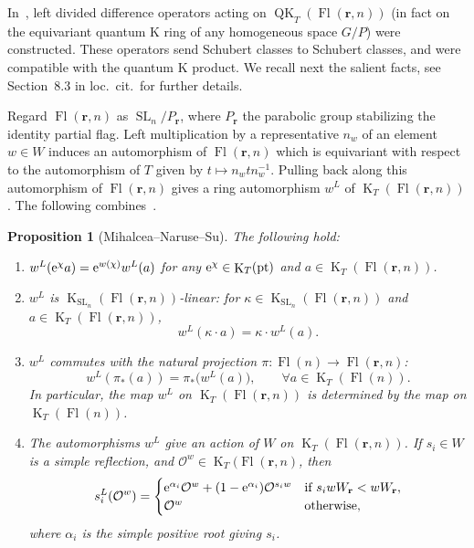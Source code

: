 \documentclass[pdftex]{sigma}
\numberwithin{equation}{section}
\newtheorem{Proposition}[Theorem]{Proposition}
\theoremstyle{definition}
\DeclareMathOperator{\SL}{SL}
\DeclareMathOperator{\Fl}{Fl}
\DeclareMathOperator{\QK}{QK}
\DeclareMathOperator{\K}{K}
\DeclareMathOperator{\pt}{pt}
\newcommand{\bfr}{{\mathbf r}}
\newcommand{\cO}{{\mathcal O}}
\begin{document}
In~\cite{Mihalcea2022Left}, left divided difference operators acting
on $\QK_T(\Fl(\bfr,n))$ (in fact on the equivariant quantum K ring of any
homogeneous space $G/P$) were constructed. These operators send Schubert classes to Schubert classes, and
were compatible with the quantum K product. We recall next the salient facts, see
Section~8.3 in loc.\ cit.\ for further details.

Regard $\Fl(\bfr,n)$ as $\SL_n/P_\bfr$, where $P_{\bfr}$ the parabolic group stabilizing the identity
partial flag. Left multiplication by a representative $n_w$ of an element $w\in W$ induces an automorphism of $\Fl(\bfr,n)$ which is equivariant with respect to the automorphism of $T$ given by $t\mapsto n_w t n_w^{-1}$. Pulling back along this automorphism of $\Fl(\bfr,n)$ gives a ring automorphism $w^L$ of $\K_T(\Fl(\bfr,n))$.
The following combines~\cite[Proposition~5.3, Lemma 5.4, and Proposition~5.5]{Mihalcea2022Left}.

\begin{Proposition}[Mihalcea--Naruse--Su]
The following hold:
\begin{enumerate}\itemsep=0pt
 \item[$1.$] $w^L({\rm e}^\chi a) = {\rm e}^{w(\chi)} w^L(a)$ for any ${\rm e}^\chi\in \K_T(\pt)$ and $a\in \K_T(\Fl(\bfr,n))$.
 \item[$2.$] $w^L$ is $\K_{\SL_n}(\Fl(\bfr,n))$-linear: for
$\kappa \in \K_{\SL_n}(\Fl(\bfr,n))$ and $a \in \K_T(\Fl(\bfr,n))$,
\[ w^L(\kappa \cdot a) = \kappa\cdot w^L(a) . \]
 \item[$3.$] $w^L$ commutes with the natural projection $\pi\colon \Fl(n) \to \Fl(\bfr,n)$:
\[ w^L(\pi_*(a)) = \pi_*\bigl(w^L(a)\bigr) , \qquad \forall a \in \K_T(\Fl(n)) . \]
In particular, the map $w^L$ on $\K_T(\Fl(\bfr,n))$ is determined by the map on $\K_T(\Fl(n))$.
 \item[$4.$] The automorphisms $w^L$ give an action of $W$ on $\K_T(\Fl(\bfr,n))$.
If $s_i \in W$ is a simple reflection, and $\cO^w \in \K_T(\Fl(\bfr,n)$, then
\begin{equation*}%
 s_i^L (\cO^w)= \begin{cases} {\rm e}^{\alpha_i}\cO^w+(1-{\rm e}^{\alpha_i})\cO^{s_i w} & \textrm{if } s_i w W_{\bfr} < w W_{\bfr}, \\ \cO^w & \textrm{otherwise} , \end{cases} \end{equation*}
where $\alpha_i$ is the simple positive root giving $s_i$.
 \end{enumerate}
\end{Proposition}
\end{document}
